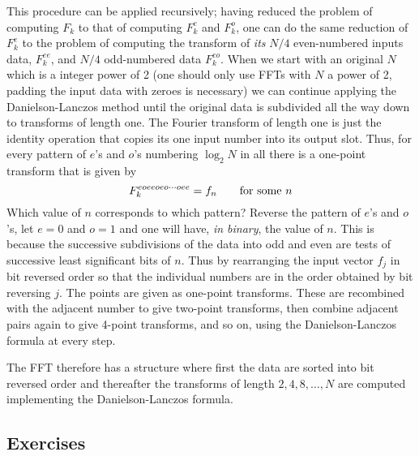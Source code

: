 This procedure can be applied recursively; having reduced the problem of
computing $F_k$ to that of computing $F_k^e$ and $F_k^o$, one can do the 
same reduction of $F_k^e$ to the problem of computing the transform of 
{\it its} $N/4$ even-numbered inputs data, $F_k^{ee}$, and $N/4$ odd-numbered 
data $F_k^{eo}$. When we start with an original $N$ which is a integer 
power of 2 (one should only use FFTs with $N$ a power of 2, padding the input
data with zeroes is necessary) we can continue applying the Danielson-Lanczos 
method until the original data is subdivided all the way down to transforms
of length one. The Fourier transform of length one is just the identity 
operation that copies its one input number into its output slot. Thus, 
for every pattern of $e$'s and $o$'s numbering $\log_2 N$ in all there is a 
one-point transform that is given by 
\[
F_k^{eoeeoeo\cdots oee}=f_n\qquad {\rm for~some~}n
\]
Which value of $n$ corresponds to which pattern? Reverse the pattern of 
$e$'s and $o$'s, let $e=0$ and $o=1$ and one will have, {\it in binary}, the
value of $n$. This is because the successive subdivisions of the data into 
odd and even are tests of successive least significant bits of $n$. Thus
by rearranging the input vector $f_j$ in bit reversed order so that the 
individual numbers are in the order obtained by bit reversing $j$. The points
are given as one-point transforms. These are recombined with the adjacent 
number to give two-point transforms, then combine adjacent pairs again to 
give 4-point transforms, and so on, using the Danielson-Lanczos formula
at every step.

The FFT therefore has a structure where first the data are sorted into
bit reversed order and thereafter the transforms of length $2,4,8,\ldots,N$
are computed implementing the Danielson-Lanczos formula.

\subsection{Exercises}

